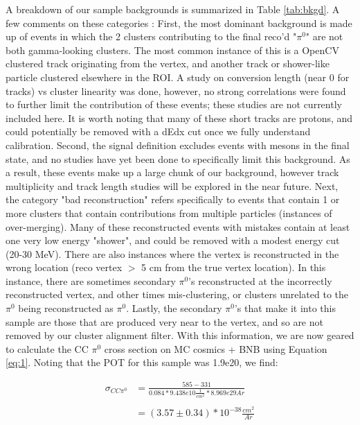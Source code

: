 \documentclass[12pt]{article}
\begin{document}
\par A breakdown of our sample backgrounds is summarized in Table \ref{tab:bkgd}. A few comments on these categories : First, the most dominant background is made up of events in which the 2 clusters contributing to the final reco'd "$\pi^0$" are not both gamma-looking clusters. The most common instance of this is a OpenCV clustered track originating from the vertex, and another track or shower-like particle clustered elsewhere in the ROI. A study on conversion length (near 0 for tracks) vs cluster linearity was done, however, no strong correlations were found to further limit the contribution of these events; these studies are not currently included here. It is worth noting that many of these short tracks are protons, and could potentially be removed with a dEdx cut once we fully understand calibration. Second, the signal definition excludes events with mesons in the final state, and no studies have yet been done to specifically limit this background. As a result, these events make up a large chunk of our background, however track multiplicity and track length studies will be explored in the near future. Next, the category "bad reconstruction" refers specifically to events that contain 1 or more clusters that contain contributions from multiple particles (instances of over-merging). Many of these reconstructed events with mistakes contain at least one very low energy "shower", and could  be removed with a modest energy cut (20-30 MeV).  There are also instances where the vertex is reconstructed in the wrong location (reco vertex $>$ 5 cm from the true vertex location). In this instance, there are sometimes secondary $\pi^0$'s reconstructed at the incorrectly reconstructed vertex, and other times mis-clustering, or clusters unrelated to the $\pi^0$ being reconstructed as $\pi^0$. Lastly, the secondary $\pi^0$'s that make it into this sample are those that are produced very near to the vertex, and so are not removed by our cluster alignment filter. 
With this information, we are now geared to calculate the CC $\pi^0$ cross section on MC cosmics + BNB using Equation \ref{eq:1}. Noting that the POT for this sample was 1.9e20, we find:

\begin{align}
\sigma_{CC\pi^0} &= \frac{585 - 331}{0.084 * 9.438e10 \frac{1}{cm^2} * 8.969e29 Ar} \\\\
&= (3.57 \pm 0.34) *10^{-38} \frac{cm^2}{Ar}
\end{align}
\end{document}

